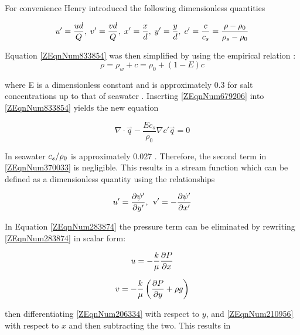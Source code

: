 For convenience Henry introduced the following dimensionless quantities

\begin{equation} \label{ZEqnNum621601} 
    u'=\frac{ud}{Q} , \; v'=\frac{vd}{Q}
     , \; x'=\frac{x}{d} , \; y'=\frac{y}{d} , \; c'=\frac{c}{c_{s} }
    =\frac{\rho -\rho _{0} }{\rho _{s} -\rho _{0} } 
\end{equation}

Equation \eqref{ZEqnNum833854} was then simplified by using the empirical
relation \cite{Baxter} \cite{Henry60}:
\begin{equation} \label{ZEqnNum679206} 
    \rho =\rho _{w} +c=\rho _{0} + \left(1-E\right)c 
\end{equation} 

where E is a dimensionless constant and is approximately 0.3 for salt concentrations up to that of
seawater \cite{Henry60}. Inserting \eqref{ZEqnNum679206} into \eqref{ZEqnNum833854} yields the new
equation

\begin{equation} \label{ZEqnNum370033} 
    \nabla \cdot \stackrel{\rightharpoonup}{q}-\frac{Ec_{s} }{\rho _{0} } 
    \nabla c'\stackrel{\rightharpoonup}{q}=0 
\end{equation}

In seawater ${c_{s} \mathord{\left/ {\vphantom {c_{s} \rho _{0} }} \right.
\kern-\nulldelimiterspace} \rho _{0} } $ is approximately 0.027 \cite{Henry60}.  Therefore, the
second term in \eqref{ZEqnNum370033} is negligible. This results in a stream function which can be
defined as a dimensionless quantity using the relationships

\begin{equation} \label{ZEqnNum615527} 
    u'=\frac{\partial \psi '}{\partial y'} \text{,\; v} '=-\frac{\partial \psi '}{\partial x'} 
\end{equation} 

In Equation \eqref{ZEqnNum283874} the pressure term can be eliminated by
rewriting \eqref{ZEqnNum283874} in scalar form:

\begin{equation} \label{ZEqnNum206334} 
    u=-\frac{k}{\mu } \frac{\partial P}{\partial x} 
\end{equation}

\begin{equation} \label{ZEqnNum210956} 
    v=-\frac{k}{\mu } \left(\frac{\partial P}{\partial y} +\rho g\right) 
\end{equation} 

then differentiating \eqref{ZEqnNum206334} with respect to $y$, and
\eqref{ZEqnNum210956} with respect to $x$ and then subtracting the two. This
results in

